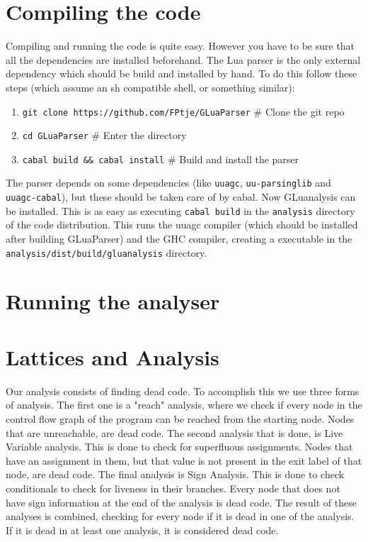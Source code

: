 \documentclass[10pt]{article}
\begin{document}
\section{Compiling the code}
Compiling and running the code is quite easy. However you have to be sure that all the dependencies are installed beforehand. The Lua parser is the only external dependency which should be build and installed by hand. To do this follow these steps (which assume an sh compatible shell, or something similar):

\begin{enumerate}
    \item \texttt{git clone https://github.com/FPtje/GLuaParser} \# Clone the git repo
    \item \texttt{cd GLuaParser} \# Enter the directory
    \item \texttt{cabal build \&\& cabal install} \# Build and install the parser
\end{enumerate}

The parser depends on some dependencies (like \texttt{uuagc}, \texttt{uu-parsinglib} and \texttt{uuagc-cabal}), but these should be taken care of by cabal. Now GLuanalysis can be installed. This is as easy as executing \texttt{cabal build} in the \texttt{analysis} directory of the code distribution. This runs the uuagc compiler (which should be installed after building GLuaParser) and the GHC compiler, creating a executable in the \texttt{analysis/dist/build/gluanalysis} directory.

\section{Running the analyser}


\section{Lattices and Analysis}
Our analysis consists of finding dead code. To accomplish this we use three forms of analysis. The first one is a "reach" analysis, where we check if every node in the control flow graph of the program can be reached from the starting node. Nodes that are unreachable, are dead code.
The second analysis that is done, is Live Variable analysis. This is done to check for superfluous assignments. Nodes that have an assignment in them, but that value is not present in the exit label of that node, are dead code.
The final analysis is Sign Analysis. This is done to check conditionals to check for liveness in their branches. Every node that does not have sign information at the end of the analysis is dead code.
The result of these analyses is combined, checking for every node if it is dead in one of the analysis. If it is dead in at least one analysis, it is considered dead code.
\end{document}
